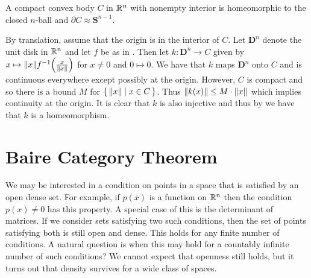 \documentclass[letterpaper, 11pt, oneside]{book}
\begin{document}
\clearpage

\begin{thrm}
  A compact convex body $C$ in $\mathbb{R}^{n}$ with nonempty interior is homeomorphic to the closed $n$-ball and $\partial C \approx \textbf{S}^{n - 1}$.
\end{thrm}
\begin{pf}
  By translation, assume that the origin is in the interior of $C$.
  Let $\textbf{D}^{n}$ denote the unit disk in $\mathbb{R}^{n}$ and let $f$ be as in .
  Then let $k\colon \textbf{D}^{n} \to C$ given by $x \mapsto \norm{x} f^{-1}\pqty{\frac{x}{\norm{x}}}$ for $x \neq 0$ and $0 \mapsto 0$.
  We have that $k$ maps $\textbf{D}^{n}$ onto $C$ and is continuous everywhere except possibly at the origin.
  However, $C$ is compact and so there is a bound $M$ for $\set{\norm{x} | x \in C}$.
  Thus $\norm{k(x)} \leq M \cdot \norm{x}$ which implies continuity at the origin.
  It is clear that $k$ is also injective and thus by  we have that $k$ is a homeomorphism.
\end{pf}

\clearpage

\chapter{Baire Category Theorem}

We may be interested in a condition on points in a space that is satisfied by an open dense set.
For example, if $p(\overline{x})$ is a function on $\mathbb{R}^{n}$ then the condition $p(x) \neq 0$ has this property.
A special case of this is the determinant of matrices.
If we consider sets satisfying two such conditions, then the set of points satisfying both is still open and dense.
This holds for any finite number of conditions.
A natural question is when this may hold for a countably infinite number of such conditions?
We cannot expect that openness still holds, but it turns out that density survives for a wide class of spaces.
\end{document}
